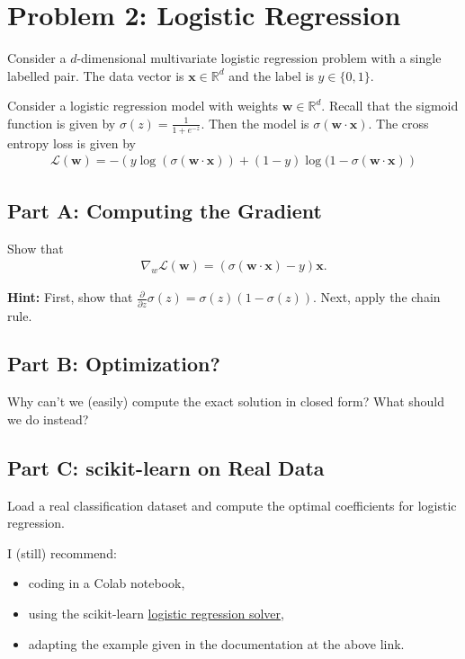 \documentclass{article}
\begin{document}
%

\newpage
\section*{Problem 2: Logistic Regression}

Consider a $d$-dimensional multivariate logistic regression problem with a single labelled pair.
The data vector is $\mathbf{x} \in \mathbb{R}^d$ and the label is $y \in \{0,1\}$.

Consider a logistic regression model with weights $\mathbf{w} \in \mathbb{R}^d$.
Recall that the sigmoid function is given by $\sigma(z) = \frac1{1+e^{-z}}.$
Then the model is $\sigma(\mathbf{w} \cdot \mathbf{x})$.
The cross entropy loss is given by
\begin{align}
    \mathcal{L}(\mathbf{w})
    = -  \left(y \log(\sigma(\mathbf{w} \cdot \mathbf{x})) + 
    (1-y) \log(1-\sigma(\mathbf{w} \cdot \mathbf{x})\right)
\end{align}

\subsection*{Part A: Computing the Gradient}

Show that 
\begin{align}
    \nabla_w\mathcal{L}(\mathbf{w}) = (\sigma(\mathbf{w} \cdot \mathbf{x})-y)\mathbf{x}.
\end{align}

\textbf{Hint:} First, show that $\frac{\partial}{\partial z} \sigma(z) = \sigma(z) (1- \sigma(z))$. Next, apply the chain rule.

\subsection*{Part B: Optimization?}

Why can't we (easily) compute the exact solution in closed form?
What should we do instead?

\subsection*{Part C: scikit-learn on Real Data}

Load a real classification dataset and compute the optimal coefficients for logistic regression.

I (still) recommend:
\begin{itemize}
    \item coding in a Colab notebook,
    \item using the scikit-learn \href{https://scikit-learn.org/stable/modules/generated/sklearn.linear_model.LogisticRegression.html}{logistic regression solver},
    \item adapting the example given in the documentation at the above link.
\end{itemize}
\end{document}
